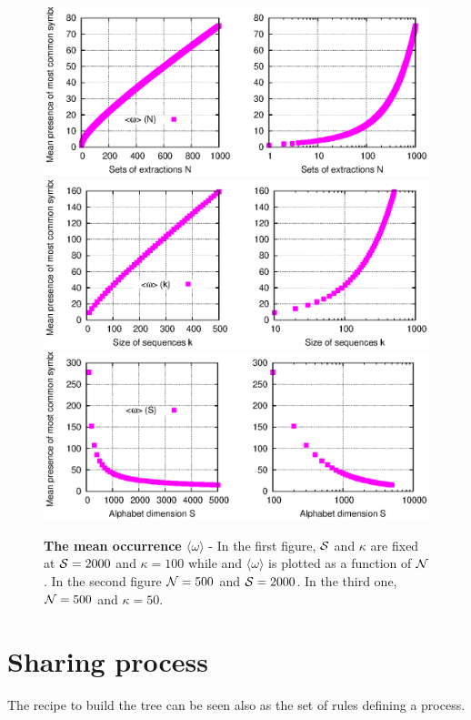 \begin{figure}[p]%
\includegraphics[width=\textwidth,draft=false]{grafici/meanN.eps}
\includegraphics[width=\textwidth,draft=false]{grafici/meank.eps}
\includegraphics[width=\textwidth,draft=false]{grafici/meanS.eps}
\caption{\label{TwN} \footnotesize\textbf{The mean occurrence $\langle\omega\rangle$ } - In the first figure, $\mathcal S$ and $\kappa$ are fixed at $\mathcal S = 2000$ and $\kappa = 100$ while and $\langle\omega\rangle$ is plotted as a function of $\mathcal N$. In the second figure $\mathcal N =500$ and $\mathcal S=2000$. In the third one, $\mathcal N=500$ and $\kappa=50$.}
\end{figure}

\section{Sharing process}
The recipe to build the tree can be seen also as the set of rules defining a process.

